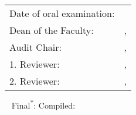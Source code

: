 %
\vspace*{\fill}%
%
%
\begin{table}[!htpb]%
\large
\begin{tabular}{>{\color{TitlePage_Color_RankB}}ll}
	\textsf{Date of oral examination}:
	&%
	\DenKrTPoralExamdate%
\\%
	\textsf{Dean of the Faculty}:
	&%
	\ifdefempty{\DenKrTPdeanAnrede}%
		{}%
		{\textcolor{black}{\DenKrTPdeanAnrede} }%
	\ifdefempty{\DenKrTPdeanTitleBefore}%
		{}%
		{\textcolor{black}{\DenKrTPdeanTitleBefore} }%
	\textcolor{black}{\DenKrTPdeanFirst} \textsc{\textcolor{black}{\DenKrTPdeanLast}}%
	\ifdefempty{\DenKrTPdeanTitleAfter}%
		{}%
		{, \textcolor{black}{\DenKrTPdeanTitleAfter}}%
\\%
	\textsf{Audit Chair}:
	&%
	\ifdefempty{\DenKrTPauditchairAnrede}%
		{}%
		{\textcolor{black}{\DenKrTPauditchairAnrede} }%
	\ifdefempty{\DenKrTPauditchairTitleBefore}%
		{}%
		{\textcolor{black}{\DenKrTPauditchairTitleBefore} }%
	\textcolor{black}{\DenKrTPauditchairFirst} \textsc{\textcolor{black}{\DenKrTPauditchairLast}}%
	\ifdefempty{\DenKrTPauditchairTitleAfter}%
		{}%
		{, \textcolor{black}{\DenKrTPauditchairTitleAfter}}%
\\%
	\textsf{1. Reviewer}:%
	&%
	\ifdefempty{\DenKrTPsupervisorOneAnrede}%
		{}%
		{\textcolor{black}{\DenKrTPsupervisorOneAnrede} }%
	\ifdefempty{\DenKrTPsupervisorOneTitleBefore}%
		{}%
		{\textcolor{black}{\DenKrTPsupervisorOneTitleBefore} }%
	\textcolor{black}{\DenKrTPsupervisorOneFirst} \textsc{\textcolor{black}{\DenKrTPsupervisorOneLast}}%
	\ifdefempty{\DenKrTPsupervisorOneTitleAfter}%
		{}%
		{, \textcolor{black}{\DenKrTPsupervisorOneTitleAfter}}%
\\%
	\textsf{2. Reviewer}:%
	&%
	\ifdefempty{\DenKrTPsupervisorTwoAnrede}%
		{}%
		{\textcolor{black}{\DenKrTPsupervisorTwoAnrede} }%
	\ifdefempty{\DenKrTPsupervisorTwoTitleBefore}%
		{}%
		{\textcolor{black}{\DenKrTPsupervisorTwoTitleBefore} }%
	\textcolor{black}{\DenKrTPsupervisorTwoFirst} \textsc{\textcolor{black}{\DenKrTPsupervisorTwoLast}}%
	\ifdefempty{\DenKrTPsupervisorTwoTitleAfter}%
		{}%
		{, \textcolor{black}{\DenKrTPsupervisorTwoTitleAfter}}%
\\%
\end{tabular}%
\end{table}%
%
\vspace*{6\baselineskip}%
%
%
\begin{flushright}%
\begin{large}%
\DenKrTPauthorFirst\ \DenKrTPauthorLast\nl%
\textsf{\color{TitlePage_Color_RankD}Final}\textsuperscript{$\ast$}: \DenKrTPdate\nl%
\textsf{\color{TitlePage_Color_RankD}Compiled}\textsuperscript{\dag}: \DenKrdateToday%
\end{large}%
\end{flushright}%
